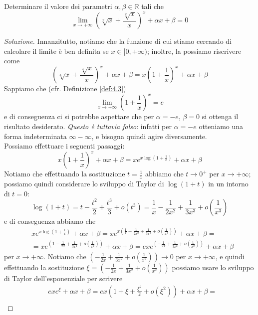 \begin{exercise}
    \label{ex:6.7}
    Determinare il valore dei parametri $\alpha, \beta\in\mathbb{R}$ tali che
    \[
    \lim_{x\to +\infty} \left(\sqrt[x]{x} + \frac{\sqrt[x]{x}}{x}\right)^x+\alpha x + \beta = 0
    \]
\end{exercise}
\begin{proof}[Soluzione]
    Innanzitutto, notiamo che la funzione di cui stiamo cercando di calcolare il limite è ben definita se $x\in [0, +\infty)$; inoltre, la possiamo riscrivere come
    \[
    \left(\sqrt[x]{x} + \frac{\sqrt[x]{x}}{x}\right)^x + \alpha x + \beta = x \left(1+\frac{1}{x}\right)^x+\alpha x + \beta 
    \]
    Sappiamo che (cfr. Definizione \ref{def:4.3})
    \[
    \lim_{x\to +\infty} \left(1+\frac{1}{x}\right)^ x = e
    \]
    e di conseguenza ci si potrebbe aspettare che per $\alpha=-e$, $\beta = 0$ si ottenga il risultato desiderato. \emph{Questo è tuttavia falso}: infatti per $\alpha=-e$ otteniamo una forma indeterminata $\infty - \infty$, e bisogna quindi agire diversamente.\\
    Possiamo effettuare i seguenti passaggi:
    \[
    x \left(1+\frac{1}{x}\right)^x+\alpha x + \beta = x e^{x\log\left(1+\frac{1}{x}\right)}+\alpha x + \beta 
    \]
    Notiamo che effettuando la sostituzione $t=\frac{1}{x}$ abbiamo che $t\to 0^+$ per $x\to+\infty$; possiamo quindi considerare lo sviluppo di Taylor di $\log(1+t)$ in un intorno di $t=0$:
    \[
    \log(1+t) = t-\frac{t^2}{2}+\frac{t^3}{3} + o(t^3) = \frac{1}{x}-\frac{1}{2x^2}+\frac{1}{3x^3} + o\left(\frac{1}{x^3}\right)
    \]
    e di conseguenza abbiamo che
    \[
    \begin{split}
        & x e^{x\log\left(1+\frac{1}{x}\right)}+\alpha x + \beta  = x e^{x\left(\frac{1}{x}-\frac{1}{2x^2}+\frac{1}{3x^3}+o\left(\frac{1}{x^3}\right)\right)}+\alpha x + \beta =  \\
        & = xe^{\left(1-\frac{1}{2x}+\frac{1}{3x^2}+o\left(\frac{1}{x^2}\right)\right)}+\alpha x + \beta = ex e^{\left(-\frac{1}{2x}+\frac{1}{3x^2} + o\left(\frac{1}{x^2}\right)\right)} + \alpha x+\beta
    \end{split}
    \]
    per $x\to +\infty$. Notiamo che $\left(-\frac{1}{2x}+\frac{1}{3x^2} + o\left(\frac{1}{x^2}\right)\right)\to 0$ per $x\to+\infty$, e quindi effettuando la sostituzione $\xi = \left(-\frac{1}{2x}+\frac{1}{3x^2} + o\left(\frac{1}{x^2}\right)\right)$ possiamo usare lo sviluppo di Taylor dell'esponenziale per scrivere
    \[
    \begin{split}
        & ex e^{\xi} + \alpha x+\beta = ex\left(1+\xi + \frac{\xi^2}{2}+o(\xi^2)\right) +\alpha x + \beta = \\

\end{split}\]
\end{proof}

